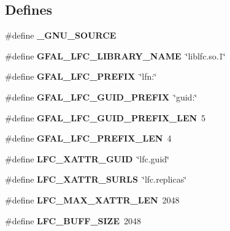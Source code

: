 \subsection*{Defines}
\begin{CompactItemize}
\item 
\#define \textbf{\_\-GNU\_\-SOURCE}\label{gfal__common__lfc_8h_53abf256730d533302d1910e5fb61efe}

\item 
\#define \textbf{GFAL\_\-LFC\_\-LIBRARY\_\-NAME}~\char`\"{}liblfc.so.1\char`\"{}\label{gfal__common__lfc_8h_7da7695351de444e2e18371bb8d6aea5}

\item 
\#define \textbf{GFAL\_\-LFC\_\-PREFIX}~\char`\"{}lfn:\char`\"{}\label{gfal__common__lfc_8h_c00d877428b39b35b4f611656b2d5215}

\item 
\#define \textbf{GFAL\_\-LFC\_\-GUID\_\-PREFIX}~\char`\"{}guid:\char`\"{}\label{gfal__common__lfc_8h_26b46ea74b4efcdd46ce519863bdc90f}

\item 
\#define \textbf{GFAL\_\-LFC\_\-GUID\_\-PREFIX\_\-LEN}~5\label{gfal__common__lfc_8h_4609690cfa23a9bb0a209f745f183c9d}

\item 
\#define \textbf{GFAL\_\-LFC\_\-PREFIX\_\-LEN}~4\label{gfal__common__lfc_8h_0f0b96660a7e6440a6556909e7195109}

\item 
\#define \textbf{LFC\_\-XATTR\_\-GUID}~\char`\"{}lfc.guid\char`\"{}\label{gfal__common__lfc_8h_8f6afce6b30cd0685eaa45170f52c98e}

\item 
\#define \textbf{LFC\_\-XATTR\_\-SURLS}~\char`\"{}lfc.replicas\char`\"{}\label{gfal__common__lfc_8h_c1963dd5788b4452446d741e07e7f417}

\item 
\#define \textbf{LFC\_\-MAX\_\-XATTR\_\-LEN}~2048\label{gfal__common__lfc_8h_cb8d26c67c686b15d05f59def23e1356}

\item 
\#define \textbf{LFC\_\-BUFF\_\-SIZE}~2048\label{gfal__common__lfc_8h_90255f6e7148a56a2c09cc15098643d5}

\end{CompactItemize}
